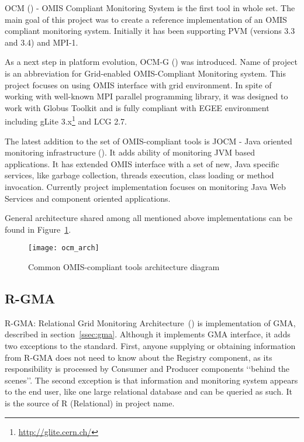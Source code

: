 OCM (\cite{RWspdt98, RW:ppam99b}) - OMIS Compliant Monitoring System is the first tool in whole set. The main goal of this project was to create a reference implementation of an OMIS compliant monitoring system. Initially it has been supporting PVM (versions 3.3 and 3.4) and MPI-1. 

As a next step in platform evolution, OCM-G (\cite{axgrid03b}) was introduced. Name of project is an abbreviation for Grid-enabled OMIS-Compliant Monitoring system. This project focuses on using OMIS interface with grid environment. In spite of working with well-known MPI parallel programming library, it was designed to work with Globus Toolkit and is fully compliant with EGEE environment including gLite 3.x\footnote{\url{http://glite.cern.ch/}} and LCG 2.7. 

The latest addition to the set of OMIS-compliant tools is JOCM - Java oriented monitoring infrastructure (\cite{jocm}). It adds ability of monitoring JVM based applications. It has extended OMIS interface with a set of new, Java specific services, like garbage collection, threads execution, class loading or method invocation. Currently project implementation focuses on monitoring Java Web Services and component oriented applications. 

General architecture shared among all mentioned above implementations can be found in Figure~\ref{fig:ocmg}.

\begin{figure}[ht]
	\centering
	\texttt{[image: ocm\_arch]}
	\caption{Common OMIS-compliant tools architecture diagram}
	\label{fig:ocmg}
\end{figure}


\subsection{R-GMA}

R-GMA: Relational Grid Monitoring Architecture~(\cite{RGMA1,RGMA2,RGMA3}) is implementation of GMA, described in section~\ref{ssec:gma}. Although it implements GMA interface, it adds two exceptions to the standard. First, anyone supplying or obtaining information from R-GMA does not need to know about the Registry component, as its responsibility is processed by Consumer and Producer components \lq\lq{}behind the scenes\rq\rq{}. The second exception is that information and monitoring system appears to the end user, like one large relational database and can be queried as such. It is the source of R (Relational) in project name.


